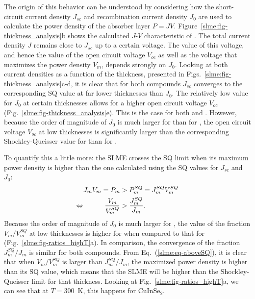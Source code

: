 \begin{refsection}
The origin of this behavior can be understood by considering how the 
short-circuit current density $J_{sc}$ and recombination current density 
$J_0$ are used to calculate the power density of the absorber layer $P = JV$. 
Figure~\ref{slme:fig-thickness_analysis}b shows the calculated \mbox{$J$-$V$} 
characteristic of . The total current 
density $J$ remains close to $J_{sc}$ up to a certain voltage. The value of 
this voltage, and hence the value of the open circuit voltage $V_{oc}$ as well as the 
voltage that maximizes the power density $V_{m}$, depends strongly on $J_0$. 
Looking at both current densities as a function of the thickness, presented in 
Figs.~\ref{slme:fig-thickness_analysis}c-d, it is clear that for both compounds $J_{sc}$ 
converges to the corresponding \gls{SQ} value at far lower thicknesses than $J_0$. The 
relatively low value for $J_0$ at certain thicknesses allows for a higher open 
circuit voltage $V_{oc}$ (Fig.~\ref{slme:fig-thickness_analysis}e). This is the case for both  and 
. However, because the order of magnitude of $J_0$ is much 
larger for  than for , the open circuit voltage $V_{oc}$ at low thicknesses is significantly larger than the corresponding Shockley-Queisser value for  than for .

To quantify this a little more: the \gls{SLME} crosses the \gls{SQ} limit when its maximum power density is higher than 
the one calculated using the \gls{SQ} values for $J_{sc}$ and $J_0$: 
\begin{equation} \label{slme:eq-aboveSQ} 
\begin{aligned} 
J_m V_m = P_m &> P_m^{SQ} = J_m^{SQ} V_m^{SQ} \\ 
\Leftrightarrow \hspace{0.4in}\frac{V_m}{V_m^{SQ}} &> \frac{J_m^{SQ}}{J_m}. 
\end{aligned} 
\end{equation} 
Because the order of magnitude of $J_0$ is much larger for 
, the value of the fraction $V_m/V_m^{SQ}$ at low 
thicknesses is higher for  when compared to that for 
 (Fig.~\ref{slme:fig-ratios_highT}a). In comparison, the 
convergence of the fraction $J_m^{SQ}/J_m$ is similar for both compounds. From 
Eq.~(\ref{slme:eq-aboveSQ}), it is clear that when $V_m/V_m^{SQ}$ is larger 
than $J_m^{SQ}/J_m$, the maximized power density is higher than its \gls{SQ} value, 
which means that the \gls{SLME} will be higher than the Shockley-Queisser limit for 
that thickness. Looking at Fig.~\ref{slme:fig-ratios_highT}a, we can see that at 
$T=300$~\si{\kelvin}, this happens for CuInSe$_2$. 


\end{refsection}
